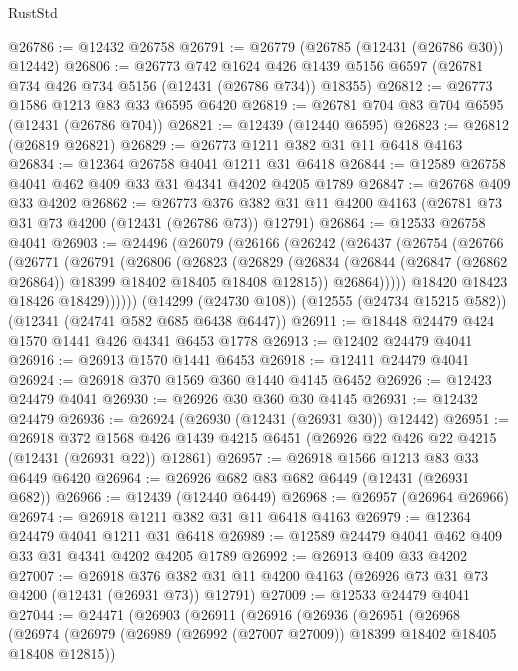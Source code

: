 \begin{lexlean}{RustStd}
\begin{coremodule}
@26786 := @12432 @26758
@26791 := @26779 (@26785 (@12431 (@26786 @30)) @12442)
@26806 := @26773
    @742
    @1624
    @426
    @1439
    @5156
    @6597
    (@26781 @734 @426 @734 @5156 (@12431 (@26786 @734)) @18355)
@26812 := @26773 @1586 @1213 @83 @33 @6595 @6420
@26819 := @26781 @704 @83 @704 @6595 (@12431 (@26786 @704))
@26821 := @12439 (@12440 @6595)
@26823 := @26812 (@26819 @26821)
@26829 := @26773 @1211 @382 @31 @11 @6418 @4163
@26834 := @12364 @26758 @4041 @1211 @31 @6418
@26844 := @12589 @26758 @4041 @462 @409 @33 @31 @4341 @4202 @4205 @1789
@26847 := @26768 @409 @33 @4202
@26862 := @26773
    @376
    @382
    @31
    @11
    @4200
    @4163
    (@26781 @73 @31 @73 @4200 (@12431 (@26786 @73)) @12791)
@26864 := @12533 @26758 @4041
@26903 := @24496
    (@26079
      (@26166
        (@26242
          (@26437
            (@26754
              (@26766
                (@26771
                  (@26791
                    (@26806
                      (@26823
                        (@26829
                          (@26834
                            (@26844 (@26847 (@26862 @26864)) @18399 @18402 @18405 @18408 @12815))
                          @26864)))))
                @18420
                @18423
                @18426
                @18429))))))
    (@14299 (@24730 @108))
    (@12555 (@24734 @15215 @582))
    (@12341 (@24741 @582 @685 @6438 @6447))
@26911 := @18448 @24479 @424 @1570 @1441 @426 @4341 @6453 @1778
@26913 := @12402 @24479 @4041
@26916 := @26913 @1570 @1441 @6453
@26918 := @12411 @24479 @4041
@26924 := @26918 @370 @1569 @360 @1440 @4145 @6452
@26926 := @12423 @24479 @4041
@26930 := @26926 @30 @360 @30 @4145
@26931 := @12432 @24479
@26936 := @26924 (@26930 (@12431 (@26931 @30)) @12442)
@26951 := @26918
    @372
    @1568
    @426
    @1439
    @4215
    @6451
    (@26926 @22 @426 @22 @4215 (@12431 (@26931 @22)) @12861)
@26957 := @26918 @1566 @1213 @83 @33 @6449 @6420
@26964 := @26926 @682 @83 @682 @6449 (@12431 (@26931 @682))
@26966 := @12439 (@12440 @6449)
@26968 := @26957 (@26964 @26966)
@26974 := @26918 @1211 @382 @31 @11 @6418 @4163
@26979 := @12364 @24479 @4041 @1211 @31 @6418
@26989 := @12589 @24479 @4041 @462 @409 @33 @31 @4341 @4202 @4205 @1789
@26992 := @26913 @409 @33 @4202
@27007 := @26918
    @376
    @382
    @31
    @11
    @4200
    @4163
    (@26926 @73 @31 @73 @4200 (@12431 (@26931 @73)) @12791)
@27009 := @12533 @24479 @4041
@27044 := @24471
    (@26903
      (@26911
        (@26916
          (@26936
            (@26951
              (@26968
                (@26974
                  (@26979 (@26989 (@26992 (@27007 @27009)) @18399 @18402 @18405 @18408 @12815))

\end{coremodule}
\end{lexlean}
